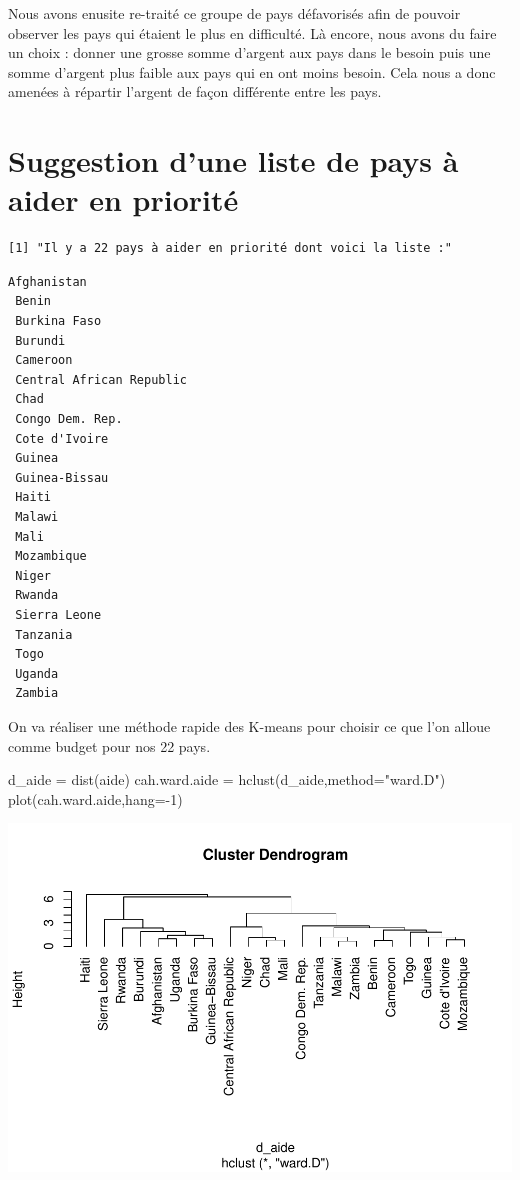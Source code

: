 \documentclass[
]{article}
\newenvironment{Shaded}{}{}
\newcommand{\AttributeTok}[1]{#1}
\newcommand{\DecValTok}[1]{#1}
\newcommand{\FunctionTok}[1]{#1}
\newcommand{\NormalTok}[1]{#1}
\newcommand{\OtherTok}[1]{\textcolor[rgb]{1.00,0.25,0.00}{#1}}
\newcommand{\SpecialCharTok}[1]{\textcolor[rgb]{0.00,0.50,0.50}{#1}}
\newcommand{\StringTok}[1]{\textcolor[rgb]{0.00,0.50,0.50}{#1}}
\begin{document}
Nous avons enusite re-traité ce groupe de pays défavorisés afin de
pouvoir observer les pays qui étaient le plus en difficulté. Là encore,
nous avons du faire un choix : donner une grosse somme d'argent aux pays
dans le besoin puis une somme d'argent plus faible aux pays qui en ont
moins besoin. Cela nous a donc amenées à répartir l'argent de façon
différente entre les pays.

\hypertarget{suggestion-dune-liste-de-pays-uxe0-aider-en-priorituxe9}{%
\section{Suggestion d'une liste de pays à aider en
priorité}\label{suggestion-dune-liste-de-pays-uxe0-aider-en-priorituxe9}}

\begin{verbatim}
[1] "Il y a 22 pays à aider en priorité dont voici la liste :"
\end{verbatim}

\begin{verbatim}
Afghanistan 
 Benin 
 Burkina Faso 
 Burundi 
 Cameroon 
 Central African Republic 
 Chad 
 Congo Dem. Rep. 
 Cote d'Ivoire 
 Guinea 
 Guinea-Bissau 
 Haiti 
 Malawi 
 Mali 
 Mozambique 
 Niger 
 Rwanda 
 Sierra Leone 
 Tanzania 
 Togo 
 Uganda 
 Zambia 
\end{verbatim}

On va réaliser une méthode rapide des K-means pour choisir ce que l'on
alloue comme budget pour nos 22 pays.

\begin{Shaded}
\begin{Highlighting}[]
\NormalTok{d\_aide }\OtherTok{=} \FunctionTok{dist}\NormalTok{(aide)}
\NormalTok{cah.ward.aide }\OtherTok{=} \FunctionTok{hclust}\NormalTok{(d\_aide,}\AttributeTok{method=}\StringTok{"ward.D"}\NormalTok{)}
\FunctionTok{plot}\NormalTok{(cah.ward.aide,}\AttributeTok{hang=}\SpecialCharTok{{-}}\DecValTok{1}\NormalTok{)}
\end{Highlighting}
\end{Shaded}

\includegraphics{Projet_files/figure-latex/unnamed-chunk-42-1.pdf}
\end{document}
